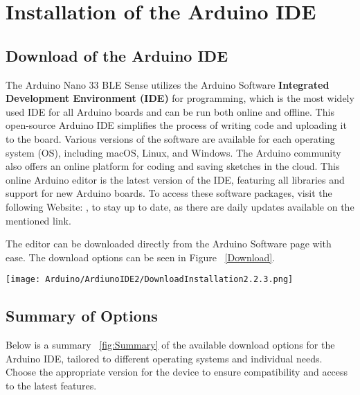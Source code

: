 




\section{Installation of the Arduino IDE}

\subsection{Download of the Arduino IDE}




The Arduino Nano 33 BLE Sense utilizes the Arduino Software \textbf{Integrated Development Environment (IDE)} for programming, which is the most widely used IDE for all Arduino boards and can be run both online and offline. This open-source Arduino IDE simplifies the process of writing code and uploading it to the board. Various versions of the software are available for each operating system (OS), including macOS, Linux, and Windows. The Arduino community also offers an online platform for coding and saving sketches in the cloud. This online Arduino editor is the latest version of the IDE, featuring all libraries and support for new Arduino boards.
To access these software packages, visit the following Website: , to stay up to date, as there are daily updates available on the mentioned link.



The editor can be downloaded directly from the Arduino Software page with ease. The download options can be seen in Figure ~\ref{Download}.

\begin{center}
        \texttt{[image: Arduino/ArdiunoIDE2/DownloadInstallation2.2.3.png]}
        \label{Download}\label{fig:DownloadInstallation2.2.3.}
\end{center}



\subsection{Summary of Options}



Below is a summary ~\ref{fig:Summary}  of the available download options for the Arduino IDE, tailored to different operating systems and individual needs. Choose the appropriate version for the device to ensure compatibility and access to the latest features.


